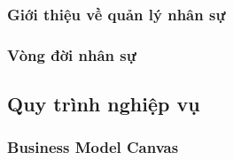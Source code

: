\documentclass{beamer}
\begin{document}
\subsubsection{Giới thiệu về quản lý nhân sự}
\subsubsection{Vòng đời nhân sự}
\subsection{Quy trình nghiệp vụ}
\subsubsection{Business Model Canvas}
\end{document}
